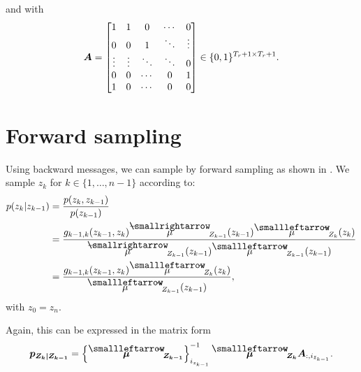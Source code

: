 \documentclass{article}
\begin{document}
    and with
    \begin{equation}
      \boldsymbol{A} = 
      \begin{bmatrix}
        1 & 1 & 0 & \cdots & 0 \\
        0 & 0 & 1 & \ddots & \vdots \\
        \vdots & \vdots & \ddots & \ddots & 0 \\
        0 & 0 & \cdots & 0 & 1 \\
        1 & 0 & \cdots & 0 & 0 \\
      \end{bmatrix} \in \{0, 1\}^{T_r + 1 \times T_r + 1}.
    \end{equation}

    \section{Forward sampling} \label{sec:forward}

    Using backward messages, we can sample by forward sampling as shown in . We sample $z_k$ for $k \in \{1, \dots, n-1\}$ according to:
    \begin{align}
      p(z_k | z_{k-1}) & = \frac{p(z_k, z_{k-1})}{p(z_{k-1})} \\
      & = \frac{g_{k-1,k}(z_{k-1}, z_{k}) \msgf{\mu}{Z_{k-1}}(z_{k-1}) \msgb{\mu}{Z_{k}}(z_{k})}{\msgf{\mu}{Z_{k-1}}(z_{k-1}) \msgb{\mu}{Z_{k-1}}(z_{k-1})} \\
      & = \frac{g_{k-1,k}(z_{k-1}, z_{k}) \msgb{\mu}{Z_{k}}(z_{k})}{\msgb{\mu}{Z_{k-1}}(z_{k-1})},
    \end{align}
    with $z_{0} = z_n$.

    Again, this can be expressed in the matrix form
    \begin{equation}
      \mat{p_{Z_{k}|Z_{k-1}}} = \left\{\mat{\msgb{\mu}{Z_{k-1}}}\right\}_{i_{z_{k-1}}}^{-1} \mat{\msgb{\mu}{Z_{k}}} \mat{A}_{:, i_{\breve{z}_{k-1}}}.
    \end{equation}
\end{document}
